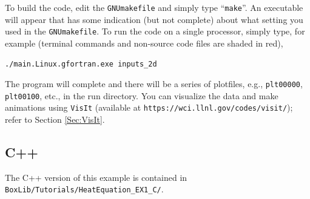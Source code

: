 To build the code, edit the {\tt GNUmakefile} and simply type ``{\tt make}''.  An 
executable will appear that has some indication (but not complete)
about what setting you used in the {\tt GNUmakefile}.  To run the code on a single processor,
simply type, for example (terminal commands and non-source code files are shaded in red),
\begin{lstlisting}[backgroundcolor=\color{light-red}]
./main.Linux.gfortran.exe inputs_2d
\end{lstlisting}
The program will complete and there will be a series of plotfiles, e.g., {\tt plt00000}, 
{\tt plt00100}, etc., in the run directory.  You can visualize the data 
and make animations using {\tt VisIt} (available at {\tt https://wci.llnl.gov/codes/visit/});
refer to Section \ref{Sec:VisIt}.

\subsection{C++}
The C++ version of this example is contained in {\tt BoxLib/Tutorials/HeatEquation\_EX1\_C/}.

